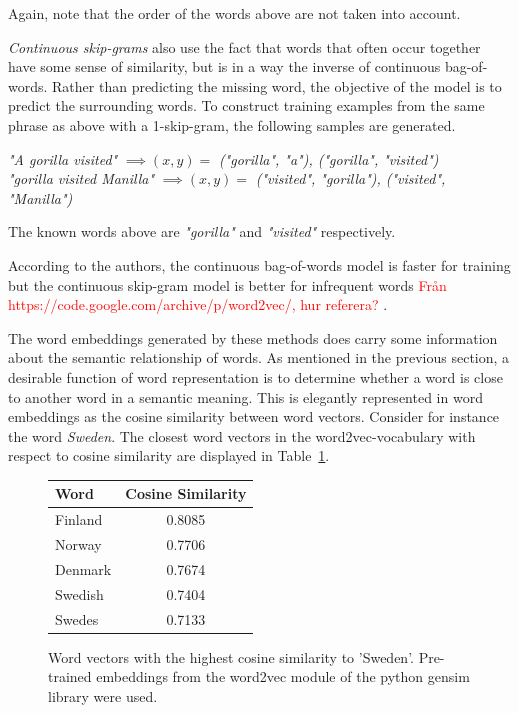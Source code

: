 Again, note that the order of the words above are not taken into account. 


\textit{Continuous skip-grams} also use the fact that words that often occur together have some sense of similarity, but is in a way the inverse of continuous bag-of-words. Rather than predicting the missing word, the objective of the model is to predict the surrounding words. To construct training examples from the same phrase as above with a 1-skip-gram, the following samples are generated. 

\begin{center}
\textit{"A gorilla visited"} $\implies (x,y) = $ \textit{("gorilla", "a"), ("gorilla", "visited")} \\ \vspace{1em}
\textit{"gorilla visited Manilla"} $\implies (x,y) = $ \textit{("visited", "gorilla"), ("visited", "Manilla")}
\end{center}

The known words above are \textit{"gorilla"} and \textit{"visited"} respectively. 

According to the authors, the continuous bag-of-words model is faster for training but the continuous skip-gram model is better for infrequent words \textcolor{red}{Från  https://code.google.com/archive/p/word2vec/, hur referera? }. 


The word embeddings generated by these methods does carry some information about the semantic relationship of words. As mentioned in the previous section, a desirable function of word representation is to determine whether a word is close to another word in a semantic meaning. This is elegantly represented in word embeddings as the cosine similarity between word vectors. Consider for instance the word \textit{Sweden}. The closest word vectors in the word2vec-vocabulary with respect to cosine similarity are displayed in Table~\ref{tab:cossim}.

\begin{figure}[h!]
    \centering
    \begin{tabular}{l|c|}
        Word & Cosine Similarity  \\
        \hline \hline 
        Finland & 0.8085 \\
        Norway  & 0.7706 \\
        Denmark & 0.7674 \\
        Swedish & 0.7404 \\
        Swedes  & 0.7133 \\
        \hline 
    \end{tabular}
    \caption{Word vectors with the highest cosine similarity to 'Sweden'. Pre-trained embeddings from the word2vec module of the python gensim library were used. }
\label{tab:cossim}
\end{figure}

